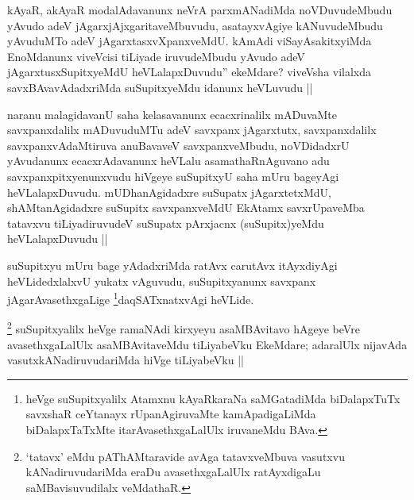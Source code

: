 
\begin{artha}
kAyaR, akAyaR modalAdavanunx neVrA parxmANadiMda noVDuvudeMbudu yAvudo adeV jAgarxjAjxgaritaveMbuvudu, asatayxvAgiye kANuvudeMbudu yAvuduMTo adeV jAgarxtasxvXpanxveMdU. kAmAdi viSayAsakitxyiMda EnoMdanunx viveVcisi tiLiyade iruvudeMbudu yAvudo adeV jAgarxtusxSupitxyeMdU heVLalapxDuvudu'' ekeMdare? viveVsha vilalxda savxBAvavAdadxriMda suSupitxyeMdu idanunx heVLuvudu ||
\end{artha}


\begin{artha}
naranu malagidavanU saha kelasavanunx ecacxrinalilx mADuvaMte savxpanxdalilx mADuvuduMTu adeV savxpanx jAgarxtutx, savxpanxdalilx savxpanxvAdaMtiruva anuBavaveV savxpanxveMbudu, noVDidadxrU yAvudanunx ecacxrAdavanunx heVLalu asamathaRnAguvano adu savxpanxpitxyenunxvudu hiVgeye suSupitxyU saha mUru bageyAgi heVLalapxDuvudu. mUDhanAgidadxre suSupatx jAgarxtetxMdU, shAMtanAgidadxre suSupitx savxpanxveMdU EkAtamx savxrUpaveMba tatavxvu tiLiyadiruvudeV suSupatx pArxjacnx (suSupitx)yeMdu heVLalapxDuvudu ||
\end{artha}


\begin{artha}
suSupitxyu mUru bage yAdadxriMda ratAvx carutAvx itAyxdiyAgi heVLidedxlalxvU yukatx vAguvudu, suSupitxyanunx savxpanx jAgarAvasethxgaLige \footnote{heVge suSupitxyalilx Atamxnu kAyaRkaraNa saMGatadiMda biDalapxTuTx savxshaR ceYtanayx rUpanAgiruvaMte kamApadigaLiMda biDalapxTaTxMte itarAvasethxgaLalUlx iruvaneMdu BAva.}daqSATxnatxvAgi heVLide.
\end{artha}


\begin{artha}
\footnote{`tatavx' eMdu pAThAMtaravide avAga tatavxveMbuva vasutxvu kANadiruvudariMda eraDu avasethxgaLalUlx ratAyxdigaLu saMBavisuvudilalx veMdathaR.}
suSupitxyalilx heVge ramaNAdi kirxyeyu asaMBAvitavo hAgeye beVre avasethxgaLalUlx asaMBAvitaveMdu tiLiyabeVku EkeMdare; adaralUlx nijavAda vasutxkANadiruvudariMda hiVge tiLiyabeVku ||
\end{artha}

